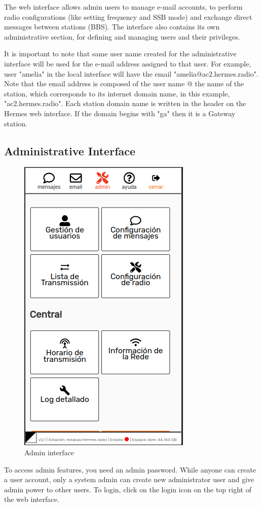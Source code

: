 \documentclass[11pt,a4paper]{article}
\begin{document}
The web interface allows admin users to manage e-mail accounts, to perform radio configurations (like setting frequency and SSB mode) and exchange direct messages between stations (BBS). The interface also contains its own administrative section, for defining and managing users and their privileges. 

It is important to note that same user name created for the administrative interface will be used for the e-mail address assigned to that user.  For example, user "amelia" in the local interface will have the email "amelia@ac2.hermes.radio". Note that the email address is composed of the user name @ the name of the station, which corresponds to its internet domain name, in this example, "ac2.hermes.radio". Each station domain name is written in the header on the Hermes web interface. If the domain begins with "ga" then it is a Gateway station.

\subsection{Administrative Interface}
\label{admininterface}

\begin{figure}[H]
    \centering
    \includegraphics[width=0.5\columnwidth]{screenshots/frontend/es/admin.png}
    \caption{Admin interface}
    \label{fig:admin}
\end{figure}

To access admin features, you need an admin password. While anyone can create a user account, only a system admin can create new administrator user and give admin power to other users. To login, click on the login icon on the top right of the web interface. 
\end{document}
